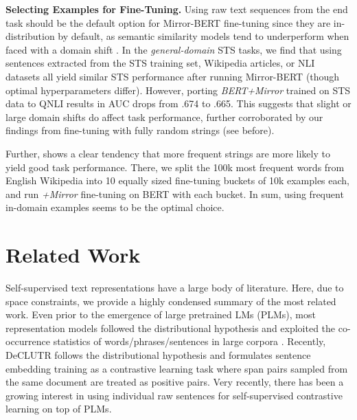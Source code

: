\documentclass[11pt]{article}
\begin{document}
\vspace{1.5mm}
\noindent \textbf{Selecting Examples for Fine-Tuning.} Using raw text sequences from the end task should be the default option for Mirror-BERT fine-tuning since they are in-distribution by default, as semantic similarity models tend to underperform when faced with a domain shift \citep{zhang2020unsupervised}. In the \textit{general-domain} STS tasks, we find that using sentences extracted from the STS training set, Wikipedia articles, or NLI datasets all yield similar STS performance after running Mirror-BERT (though optimal hyperparameters differ). However, porting \textit{BERT+Mirror} trained on STS data to QNLI results in AUC drops from .674 to .665. This suggests that slight or large domain shifts do affect task performance, further corroborated by our findings from fine-tuning with fully random strings (see before). 





Further,  shows a clear tendency that more frequent strings are more likely to yield good task performance. There, we split the 100k most frequent words from English Wikipedia into 10 equally sized fine-tuning buckets of 10k examples each, and run \textit{+Mirror} fine-tuning on BERT with each bucket. In sum, using frequent in-domain examples seems to be the optimal choice.



\section{Related Work}
Self-supervised text representations have a large body of literature. Here, due to space constraints, we provide a highly condensed summary of the most related work. Even prior to the emergence of large pretrained LMs (PLMs), most representation models followed the distributional hypothesis \citep{harris1954distributional} and exploited the co-occurrence statistics of words/phrases/sentences in large corpora  \citep{mikolov2013efficient,mikolov2013distributed,pennington-etal-2014-glove,kiros2015skip,hill2016learning,logeswaran2018an}. Recently, DeCLUTR \citep{giorgi-etal-2021-declutr} follows the  distributional hypothesis and formulates sentence embedding training as a contrastive learning task where span pairs sampled from the same document are treated as positive pairs. Very recently, there has been a growing interest in using individual raw sentences for self-supervised contrastive learning on top of PLMs. 
\end{document}
